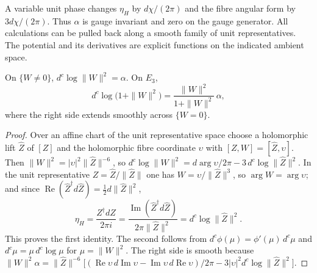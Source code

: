 A variable unit phase changes $\eta_H$ by $d\chi/(2\pi)$ and the fibre angular form by $3d\chi/(2\pi)$.
Thus $\alpha$ is gauge invariant and zero on the gauge generator. All calculations can be pulled back along a smooth
family of unit representatives. The potential and its derivatives are explicit functions on the indicated ambient space.

\begin{lemma}\label{lem:rtc-dc}
On $\{W\ne0\}$, $d^c\log\|W\|^2=\alpha$. On $E_3$,
\[
 d^c\log\big(1+\|W\|^2\big)=\frac{\|W\|^2}{1+\|W\|^2}\,\alpha ,
\]
where the right side extends smoothly across $\{W=0\}$.
\end{lemma}

\begin{proof}
Over an affine chart of the unit representative space choose a holomorphic lift $\hat Z$ of $[Z]$ and the holomorphic fibre coordinate
$\upsilon$ with $[Z,W]=[\hat Z,\upsilon]$. Then $\|W\|^2=|\upsilon|^2\|\hat Z\|^{-6}$, so
$d^c\log\|W\|^2=d\arg\upsilon/2\pi-3\,d^c\log\|\hat Z\|^2$. In the unit representative $Z=\hat Z/\|\hat Z\|$ one has
$W=\upsilon/\|\hat Z\|^3$, so $\arg W=\arg\upsilon$; and since $\operatorname{Re}(\hat Z^\dagger d\hat Z)=\frac12d\|\hat Z\|^2$,
\[
 \eta_H=\frac{Z^\dagger dZ}{2\pi i}=\frac{\operatorname{Im}(\hat Z^\dagger d\hat Z)}{2\pi\|\hat Z\|^2}=d^c\log\|\hat Z\|^2 .
\]
This proves the first identity. The second follows from $d^c\phi(\mu)=\phi'(\mu)\,d^c\mu$ and $d^c\mu=\mu\,d^c\log\mu$ for
$\mu=\|W\|^2$. The right side is smooth because
$\|W\|^2\alpha=\|\hat Z\|^{-6}\big[(\operatorname{Re}\upsilon\,d\operatorname{Im}\upsilon-\operatorname{Im}\upsilon\,d\operatorname{Re}\upsilon)/2\pi
-3|\upsilon|^2d^c\log\|\hat Z\|^2\big]$.
\end{proof}

